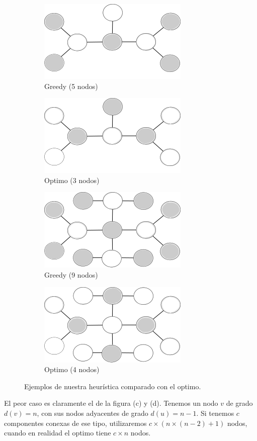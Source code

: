 \begin{figure}[ht]
\centering
\begin{subfigure}[b]{0.4\textwidth}
	\includegraphics[scale=0.6]{images/greedy_fail.png}
	\caption{Greedy (5 nodos)}
\end{subfigure}
\begin{subfigure}[b]{0.4\textwidth}
	\includegraphics[scale=0.6]{images/greedy_best.png}
	\caption{Optimo (3 nodos)}
\end{subfigure}

\begin{subfigure}[b]{0.4\textwidth}
	\includegraphics[scale=0.6]{images/greedy_fail2.png}
	\caption{Greedy (9 nodos)}
\end{subfigure}
\begin{subfigure}[b]{0.4\textwidth}
	\includegraphics[scale=0.6]{images/greedy_best2.png}
	\caption{Optimo (4 nodos)}
\end{subfigure}
\caption{Ejemplos de nuestra heurística comparado con el optimo.}
\end{figure}

El peor caso es claramente el de la figura (c) y (d). Tenemos un nodo $v$ de grado $d(v) = n$, con sus nodos adyacentes de grado $d(u) = n - 1$. Si tenemos $c$ componentes conexas de ese tipo, utilizaremos $c \times (n \times (n-2) + 1)$ nodos, cuando en realidad el optimo tiene $c \times n$ nodos.



